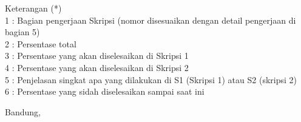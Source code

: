 \documentclass[a4paper,twoside]{article}
\begin{document}
Keterangan (*)\\
1 : Bagian pengerjaan Skripsi (nomor disesuaikan dengan detail pengerjaan di bagian 5)\\
2 : Persentase total \\
3 : Persentase yang akan diselesaikan di Skripsi 1 \\
4 : Persentase yang akan diselesaikan di Skripsi 2 \\
5 : Penjelasan singkat apa yang dilakukan di S1 (Skripsi 1) atau S2 (skripsi 2)\\
6 : Persentase yang sidah diselesaikan sampai saat ini 


\pagebreak

\vspace{1cm}
\centering Bandung, \tanggal\\
\vspace{2cm} \nama \\ 
\vspace{1cm}
\end{document}

